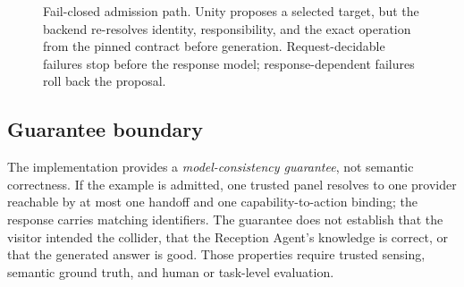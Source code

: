 \begin{figure}[t]
  \caption{Fail-closed admission path.  Unity proposes a selected target, but
  the backend re-resolves identity, responsibility, and the exact operation
  from the pinned contract before generation.  Request-decidable failures stop
  before the response model; response-dependent failures roll back the
  proposal.}
  \label{fig:admission-boundary}
\end{figure}

\subsection{Guarantee boundary}

The implementation provides a \emph{model-consistency guarantee}, not semantic
correctness.  If the example is admitted, one trusted panel resolves to one
provider reachable by at most one handoff and one capability-to-action binding;
the response carries matching identifiers.  The guarantee does not establish
that the visitor intended the collider, that the Reception Agent's knowledge is
correct, or that the generated answer is good.  Those properties require
trusted sensing, semantic ground truth, and human or task-level evaluation.
